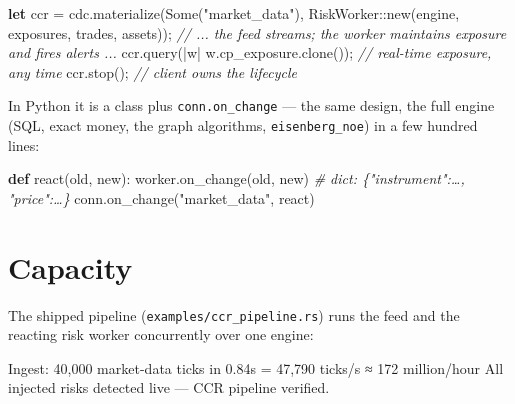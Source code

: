 \documentclass[
  11pt,
  openany]{book}
\newenvironment{Shaded}{}{}
\newcommand{\CommentTok}[1]{\textcolor[rgb]{0.38,0.63,0.69}{\textit{#1}}}
\newcommand{\ConstantTok}[1]{\textcolor[rgb]{0.53,0.00,0.00}{#1}}
\newcommand{\KeywordTok}[1]{\textcolor[rgb]{0.00,0.44,0.13}{\textbf{#1}}}
\newcommand{\NormalTok}[1]{#1}
\newcommand{\OperatorTok}[1]{\textcolor[rgb]{0.40,0.40,0.40}{#1}}
\newcommand{\PreprocessorTok}[1]{\textcolor[rgb]{0.74,0.48,0.00}{#1}}
\newcommand{\StringTok}[1]{\textcolor[rgb]{0.25,0.44,0.63}{#1}}
\begin{document}
\begin{Shaded}
\begin{Highlighting}[]
\KeywordTok{let}\NormalTok{ ccr }\OperatorTok{=}\NormalTok{ cdc}\OperatorTok{.}\NormalTok{materialize(}\ConstantTok{Some}\NormalTok{(}\StringTok{"market\_data"}\NormalTok{)}\OperatorTok{,} \PreprocessorTok{RiskWorker::}\NormalTok{new(engine}\OperatorTok{,}\NormalTok{ exposures}\OperatorTok{,}\NormalTok{ trades}\OperatorTok{,}\NormalTok{ assets))}\OperatorTok{;}
\CommentTok{// ... the feed streams; the worker maintains exposure and fires alerts ...}
\NormalTok{ccr}\OperatorTok{.}\NormalTok{query(}\OperatorTok{|}\NormalTok{w}\OperatorTok{|}\NormalTok{ w}\OperatorTok{.}\NormalTok{cp\_exposure}\OperatorTok{.}\NormalTok{clone())}\OperatorTok{;}   \CommentTok{// real{-}time exposure, any time}
\NormalTok{ccr}\OperatorTok{.}\NormalTok{stop()}\OperatorTok{;}                             \CommentTok{// client owns the lifecycle}
\end{Highlighting}
\end{Shaded}

In Python it is a class plus \texttt{conn.on\_change} --- the same
design, the full engine (SQL, exact money, the graph algorithms,
\texttt{eisenberg\_noe}) in a few hundred lines:

\begin{Shaded}
\begin{Highlighting}[]
\KeywordTok{def}\NormalTok{ react(old, new):}
\NormalTok{    worker.on\_change(old, new)          }\CommentTok{\# dict: \{"instrument":…, "price":…\}}
\NormalTok{conn.on\_change(}\StringTok{"market\_data"}\NormalTok{, react)}
\end{Highlighting}
\end{Shaded}

\section{Capacity}\label{capacity}

The shipped pipeline (\texttt{examples/ccr\_pipeline.rs}) runs the feed
and the reacting risk worker concurrently over one engine:

\begin{Shaded}
\begin{Highlighting}[]
\NormalTok{Ingest: 40,000 market{-}data ticks in 0.84s}
\NormalTok{        = 47,790 ticks/s  ≈  172 million/hour}
\NormalTok{All injected risks detected live — CCR pipeline verified.}
\end{Highlighting}
\end{Shaded}
\end{document}
